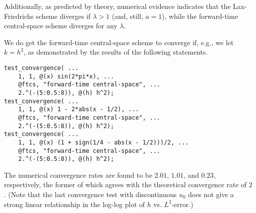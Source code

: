 \documentclass{article}
\begin{document}
\begin{itemize}
Additionally, as predicted by theory, numerical evidence indicates that the Lax-Friedrichs scheme diverges if $\lambda > 1$ (and, still, $a = 1$), while the forward-time central-space scheme diverges for any $\lambda$.

We do get the forward-time central-space scheme to converge if, e.g., we let $k = h^2$, as demonstrated by the results of the following statements.
\begin{verbatim}
test_convergence( ...
    1, 1, @(x) sin(2*pi*x), ...
    @ftcs, "forward-time central-space", ...
    2.^(-(5:0.5:8)), @(h) h^2);
test_convergence( ...
    1, 1, @(x) 1 - 2*abs(x - 1/2), ...
    @ftcs, "forward-time central-space", ...
    2.^(-(5:0.5:8)), @(h) h^2);
test_convergence( ...
    1, 1, @(x) (1 + sign(1/4 - abs(x - 1/2)))/2, ...
    @ftcs, "forward-time central-space", ...
    2.^(-(5:0.5:8)), @(h) h^2);
\end{verbatim}
The numerical convergence rates are found to be $2.01$, $1.01$, and $0.23$, respectively, the former of which agrees with the theoretical convergence rate of $2$. (Note that the last convergence test with discontinuous $u_0$ does not give a strong linear relationship in the log-log plot of $h$ vs. $L^2$-error.)

\end{itemize}
\end{document}
